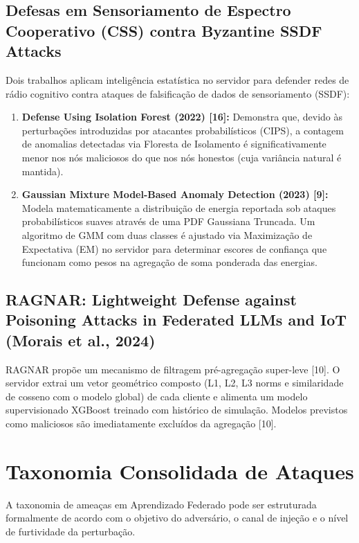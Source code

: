 \documentclass[11pt,a4paper]{article}
\begin{document}
\subsection{Defesas em Sensoriamento de Espectro Cooperativo (CSS) contra Byzantine SSDF Attacks}
Dois trabalhos aplicam inteligência estatística no servidor para defender redes de rádio cognitivo contra ataques de falsificação de dados de sensoriamento (SSDF):
\begin{enumerate}
\item \textbf{Defense Using Isolation Forest (2022) [16]:} Demonstra que, devido às perturbações introduzidas por atacantes probabilísticos (CIPS), a contagem de anomalias detectadas via Floresta de Isolamento é significativamente menor nos nós maliciosos do que nos nós honestos (cuja variância natural é mantida).
\item \textbf{Gaussian Mixture Model-Based Anomaly Detection (2023) [9]:} Modela matematicamente a distribuição de energia reportada sob ataques probabilísticos suaves através de uma PDF Gaussiana Truncada. Um algoritmo de GMM com duas classes é ajustado via Maximização de Expectativa (EM) no servidor para determinar escores de confiança que funcionam como pesos na agregação de soma ponderada das energias.
\end{enumerate}

\subsection{RAGNAR: Lightweight Defense against Poisoning Attacks in Federated LLMs and IoT (Morais et al., 2024)}
RAGNAR propõe um mecanismo de filtragem pré-agregação super-leve [10]. O servidor extrai um vetor geométrico composto (L1, L2, L3 norms e similaridade de cosseno com o modelo global) de cada cliente e alimenta um modelo supervisionado XGBoost treinado com histórico de simulação. Modelos previstos como maliciosos são imediatamente excluídos da agregação [10].

\section{Taxonomia Consolidada de Ataques}

A taxonomia de ameaças em Aprendizado Federado pode ser estruturada formalmente de acordo com o objetivo do adversário, o canal de injeção e o nível de furtividade da perturbação.
\end{document}

